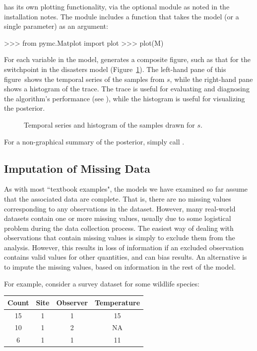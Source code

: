 \documentclass[]{jss}
\begin{document}
 has its own plotting functionality, via the optional
 module as noted in the installation notes. The
 module includes a  function that takes the
model (or a single parameter) as an argument:
\begin{CodeInput}
>>> from pymc.Matplot import plot
>>> plot(M)
\end{CodeInput}
For each variable in the model,  generates a composite figure, such as that for the switchpoint in the disasters model (Figure~\ref{fig:switch}). The left-hand pane of this figure~shows the temporal series of the samples from $s$, while the right-hand pane shows a histogram of the trace. The trace is useful for evaluating and diagnosing the algorithm's performance (see \cite*{gelman}), while the histogram is useful for visualizing the posterior.
\begin{figure}[h!]
\begin{center}
   \caption{Temporal series and histogram of the samples drawn for $s$. }
\label{fig:switch}
\end{center}
\end{figure}

For a non-graphical summary of the posterior, simply call .


\subsection{Imputation of Missing Data}


As with most ``textbook examples", the models we have examined so far assume that the associated data are complete. That is, there are no missing values corresponding to any observations in the dataset. However, many real-world datasets contain one or more missing values, usually due to some logistical problem during the data collection process. The easiest way of dealing with observations that contain missing values is simply to exclude them from the analysis. However, this results in loss of information if an excluded observation contains valid values for other quantities, and can bias results. An alternative is to impute the missing values, based on information in the rest of the model.

For example, consider a survey dataset for some wildlife species:

\begin{table}
\begin{center}
\begin{tabular}{cccc}
\hline
Count & Site & Observer & Temperature\\
\hline
15 & 1 & 1 & 15\\
10 & 1 & 2 & NA\\
6 & 1 & 1 & 11\\
\hline
\end{tabular}
\end{center}
\end{table}
\end{document}
